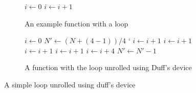 \begin{figure}[h]
    \begin{subfigure}[b]{0.5\textwidth}
        \centering
        \begin{algorithmic}
                \State $i \gets 0$
                    \State {}
                    \State $i \gets i + 1$
                \EndWhile
            \EndFunction
        \end{algorithmic}
        \caption{An example function with a loop}
    \end{subfigure}
    \begin{subfigure}[b]{0.5\textwidth}
        \centering
        \begin{algorithmic}
                \State $i \gets 0$
                \State $N' \gets (N + (4 - 1)) / 4$
`               
                        \State {}
                        \State $i \gets i + 1$ 
                    \EndCase
                        \State {}
                        \State $i \gets i + 1$ 
                    \EndCase
                        \State {}
                        \State $i \gets i + 1$ 
                    \EndCase
                        \State {}
                        \State $i \gets i + 1$
                    \EndCase
                \EndSwitch
                    \State {}
                    \State {}
                    \State {}
                    \State {}
                    \State $i \gets i + 4$
                    \State $N' \gets N' - 1$
                \EndWhile
            \EndFunction
        \end{algorithmic}
        \caption{A function with the loop unrolled using Duff's device}
    \end{subfigure}
    \caption{A simple loop unrolled using duff's device}
    \label{fig:basics:duff}
\end{figure}
